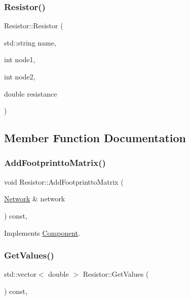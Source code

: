 \subsubsection{\texorpdfstring{Resistor()}{Resistor()}}
{\footnotesize\ttfamily Resistor\+::\+Resistor (\begin{DoxyParamCaption}\item[{std\+::string}]{name,  }\item[{int}]{node1,  }\item[{int}]{node2,  }\item[{double}]{resistance }\end{DoxyParamCaption})\hspace{0.3cm}{\ttfamily [inline]}}



\subsection{Member Function Documentation}
\mbox{\label{classResistor_a1e2d669a6b28b5b46457af5caae7462c}} 
\subsubsection{\texorpdfstring{Add\+Footprintto\+Matrix()}{AddFootprinttoMatrix()}}
{\footnotesize\ttfamily void Resistor\+::\+Add\+Footprintto\+Matrix (\begin{DoxyParamCaption}\item[{\hyperlink{classNetwork}{Network} \&}]{network }\end{DoxyParamCaption}) const\hspace{0.3cm}{\ttfamily [override]}, {\ttfamily [virtual]}}



Implements \hyperlink{classComponent_a833d40a0f50c3c06dcab2e035b758e6f}{Component}.

\mbox{\label{classResistor_ad4d08c34efa99287438aac338d7012d7}} 
\subsubsection{\texorpdfstring{Get\+Values()}{GetValues()}}
{\footnotesize\ttfamily std\+::vector$<$ double $>$ Resistor\+::\+Get\+Values (\begin{DoxyParamCaption}{ }\end{DoxyParamCaption}) const\hspace{0.3cm}{\ttfamily [override]}, {\ttfamily [virtual]}}




